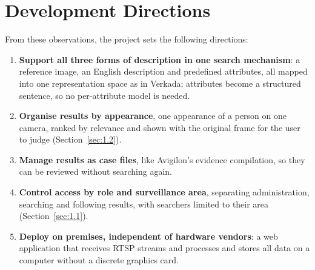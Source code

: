 \section{Development Directions}
\label{sec:2.3}

From these observations, the project sets the following directions:
\begin{enumerate}
    \item \textbf{Support all three forms of description in one search mechanism}: a reference image, an English description and predefined attributes, all mapped into one representation space as in Verkada; attributes become a structured sentence, so no per-attribute model is needed.
    \item \textbf{Organise results by appearance}, one appearance of a person on one camera, ranked by relevance and shown with the original frame for the user to judge (Section~\ref{sec:1.2}).
    \item \textbf{Manage results as case files}, like Avigilon's evidence compilation, so they can be reviewed without searching again.
    \item \textbf{Control access by role and surveillance area}, separating administration, searching and following results, with searchers limited to their area (Section~\ref{sec:1.1}).
    \item \textbf{Deploy on premises, independent of hardware vendors}: a web application that receives RTSP streams and processes and stores all data on a computer without a discrete graphics card.
\end{enumerate}
